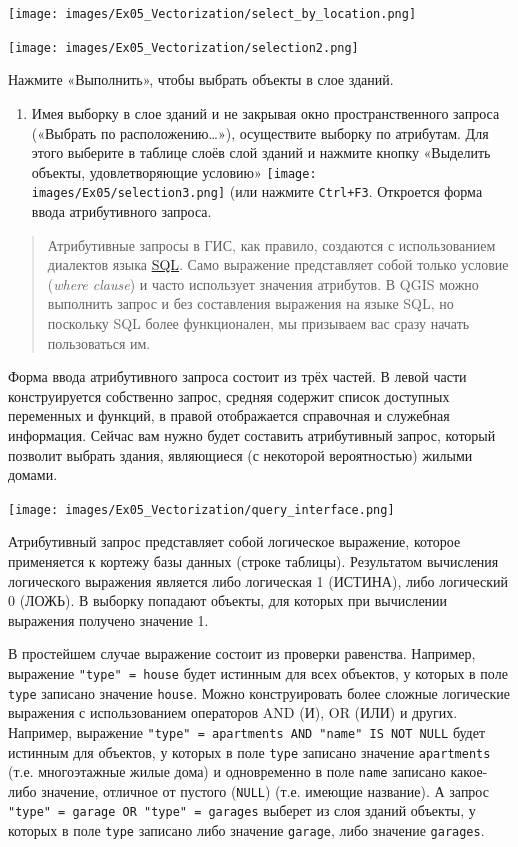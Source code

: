 \documentclass[
  12pt,
]{book}
\providecommand{\tightlist}{%
  \setlength{\itemsep}{0pt}\setlength{\parskip}{0pt}}
\begin{document}
\texttt{[image: images/Ex05\_Vectorization/select\_by\_location.png]}

\texttt{[image: images/Ex05\_Vectorization/selection2.png]}

Нажмите «Выполнить», чтобы выбрать объекты в слое зданий.

\begin{enumerate}
\def\labelenumi{\arabic{enumi}.}
\setcounter{enumi}{5}
\tightlist
\item
  Имея выборку в слое зданий и не закрывая окно пространственного запроса («Выбрать по расположению\ldots»), осуществите выборку по атрибутам. Для этого выберите в таблице слоёв слой зданий и нажмите кнопку «Выделить объекты, удовлетворяющие условию» \texttt{[image: images/Ex05/selection3.png]} (или нажмите \texttt{Ctrl+F3}. Откроется форма ввода атрибутивного запроса.
\end{enumerate}

\begin{quote}
Атрибутивные запросы в ГИС, как правило, создаются с использованием диалектов языка \href{https://ru.wikipedia.org/wiki/SQL}{SQL}. Само выражение представляет собой только условие (\emph{where clause}) и часто использует значения атрибутов. В QGIS можно выполнить запрос и без составления выражения на языке SQL, но поскольку SQL более функционален, мы призываем вас сразу начать пользоваться им.
\end{quote}

Форма ввода атрибутивного запроса состоит из трёх частей. В левой части конструируется собственно запрос, средняя содержит список доступных переменных и функций, в правой отображается справочная и служебная информация. Сейчас вам нужно будет составить атрибутивный запрос, который позволит выбрать здания, являющиеся (с некоторой вероятностью) жилыми домами.

\texttt{[image: images/Ex05\_Vectorization/query\_interface.png]}

Атрибутивный запрос представляет собой логическое выражение, которое применяется к кортежу базы данных (строке таблицы). Результатом вычисления логического выражения является либо логическая 1 (ИСТИНА), либо логический 0 (ЛОЖЬ). В выборку попадают объекты, для которых при вычислении выражения получено значение 1.

В простейшем случае выражение состоит из проверки равенства. Например, выражение \texttt{"type"\ =\ \textquotesingle{}house\textquotesingle{}} будет истинным для всех объектов, у которых в поле \texttt{type} записано значение \texttt{house}. Можно конструировать более сложные логические выражения с использованием операторов AND (И), OR (ИЛИ) и других. Например, выражение \texttt{"type"\ =\ \textquotesingle{}apartments\textquotesingle{}\ AND\ "name"\ IS\ NOT\ NULL} будет истинным для объектов, у которых в поле \texttt{type} записано значение \texttt{apartments} (т.е. многоэтажные жилые дома) и одновременно в поле \texttt{name} записано какое-либо значение, отличное от пустого (\texttt{NULL}) (т.е. имеющие название). А запрос \texttt{"type"\ =\ \textquotesingle{}garage\textquotesingle{}\ OR\ "type"\ =\ \textquotesingle{}garages\textquotesingle{}} выберет из слоя зданий объекты, у которых в поле \texttt{type} записано либо значение \texttt{garage}, либо значение \texttt{garages}.
\end{document}
